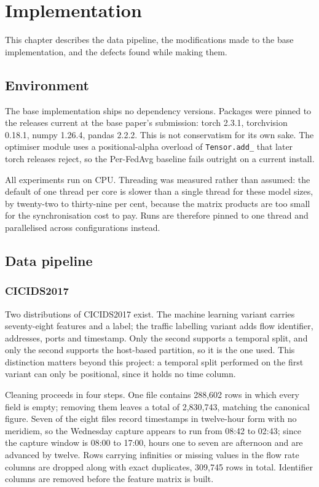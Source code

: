 \chapter{Implementation}
\label{chap:implementation}

This chapter describes the data pipeline, the modifications made to the base
implementation, and the defects found while making them.

\section{Environment}
\label{sec:environment}

The base implementation ships no dependency versions. Packages were pinned to
the releases current at the base paper's submission: torch 2.3.1, torchvision
0.18.1, numpy 1.26.4, pandas 2.2.2. This is not conservatism for its own sake.
The optimiser module uses a positional-alpha overload of \texttt{Tensor.add\_}
that later torch releases reject, so the Per-FedAvg baseline fails outright on a
current install.

All experiments run on CPU. Threading was measured rather than assumed: the
default of one thread per core is slower than a single thread for these model
sizes, by twenty-two to thirty-nine per cent, because the matrix products are
too small for the synchronisation cost to pay. Runs are therefore pinned to one
thread and parallelised across configurations instead.

\section{Data pipeline}
\label{sec:pipeline}

\subsection{CICIDS2017}

Two distributions of CICIDS2017 exist. The machine learning variant carries
seventy-eight features and a label; the traffic labelling variant adds flow
identifier, addresses, ports and timestamp. Only the second supports a temporal
split, and only the second supports the host-based partition, so it is the one
used. This distinction matters beyond this project: a temporal split performed
on the first variant can only be positional, since it holds no time column.

Cleaning proceeds in four steps. One file contains 288,602 rows in which every
field is empty; removing them leaves a total of 2,830,743, matching the
canonical figure. Seven of the eight files record timestamps in twelve-hour
form with no meridiem, so the Wednesday capture appears to run from 08:42 to
02:43; since the capture window is 08:00 to 17:00, hours one to seven are
afternoon and are advanced by twelve. Rows carrying infinities or missing values
in the flow rate columns are dropped along with exact duplicates, 309,745 rows
in total. Identifier columns are removed before the feature matrix is built.

